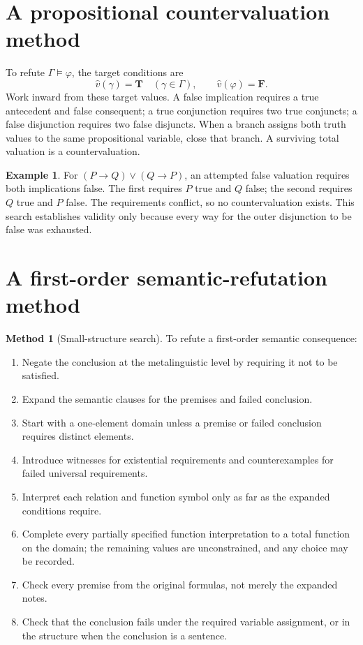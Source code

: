 \documentclass[11pt,oneside,openany]{book}
\theoremstyle{definition}
\newtheorem{example}[definition]{Example}
\newtheorem{method}[definition]{Method}
\theoremstyle{plain}
\theoremstyle{remark}
\newcommand{\entails}{\models}
\newcommand{\True}{\mathbf{T}}
\newcommand{\False}{\mathbf{F}}
\begin{document}
\section{A propositional countervaluation method}
\label{sec:formal-practice-02}

To refute \(\Gamma\entails\varphi\), the target conditions are
\[
  \widehat v(\gamma)=\True\quad(\gamma\in\Gamma),
  \qquad
  \widehat v(\varphi)=\False.
\]
Work inward from these target values.  A false implication requires a true
antecedent and false consequent; a true conjunction requires two true
conjuncts; a false disjunction requires two false disjuncts.  When a branch
assigns both truth values to the same propositional variable, close that branch.
A surviving total valuation is a countervaluation.

\begin{example}
For \((P\to Q)\lor(Q\to P)\), an attempted false valuation requires both
implications false.  The first requires \(P\) true and \(Q\) false; the second
requires \(Q\) true and \(P\) false.  The requirements conflict, so no
countervaluation exists.  This search establishes validity only because every
way for the outer disjunction to be false was exhausted.
\end{example}

\section{A first-order semantic-refutation method}
\label{sec:formal-practice-03}

\begin{method}[Small-structure search]
To refute a first-order semantic consequence:
\begin{enumerate}
  \item Negate the conclusion at the metalinguistic level by requiring it not to
        be satisfied.
  \item Expand the semantic clauses for the premises and failed conclusion.
  \item Start with a one-element domain unless a premise or failed conclusion
        requires distinct elements.
  \item Introduce witnesses for existential requirements and counterexamples
        for failed universal requirements.
  \item Interpret each relation and function symbol only as far as the expanded
        conditions require.
  \item Complete every partially specified function interpretation to a
        total function on the domain; the remaining values are
        unconstrained, and any choice may be recorded.
  \item Check every premise from the original formulas, not merely the expanded
        notes.
  \item Check that the conclusion fails under the required variable assignment,
        or in the structure when the conclusion is a sentence.
\end{enumerate}
\end{method}
\end{document}
